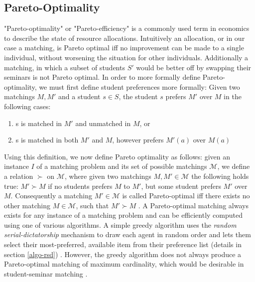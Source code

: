\subsection{Pareto-Optimality}
"Pareto-optimality" or "Pareto-efficiency" is a commonly used term in economics to describe the state of resource allocations. Intuitively an allocation, or in our case a matching, is Pareto optimal iff no improvement can be made to a single individual, without worsening the situation for other individuals. Additionally a matching, in which a subset of students $S'$ would be better off by swapping their seminars is not Pareto optimal.
In order to more formally define Pareto-optimality, we must first define student preferences more formally: 
Given two matchings $M, M'$ and a student $s \in S$, the student $s$ prefers $M'$ over $M$ in the following cases:
\begin{enumerate}
    \item s is matched in $M'$ and unmatched in $M$, or
    \item s is matched in both $M'$ and $M$, however prefers $M'(a)$ over $M(a)$
\end{enumerate}
Using this definition, we now define Pareto optimality as follows: given an instance $I$ of a matching problem and its set of possible matchings $\mathcal{M}$, we define a relation $\succ$ on $\mathcal{M}$, where given two matchings $M, M' \in \mathcal{M}$ the following holds true: $M' \succ M$ if no students prefers $M$ to $M'$, but some student prefers $M'$ over $M$. Consequently a matching $M' \in \mathcal{M}$ is called Pareto-optimal iff there exists no other matching $M \in \mathcal{M}$, such that $M' \succ M$ \cite{algorithmics}. A Pareto-optimal matching always exists for any instance of a matching problem and can be efficiently computed using one of various algorithms. A simple greedy algorithm uses the \emph{random serial-dictatorship} mechanism to draw each agent in random order and lets them select their most-preferred, available item from their preference list (details in section \ref{algo-rsd}) \cite{RothTwoSided, SerialDictatorship}. However, the greedy algorithm does not always produce a Pareto-optimal matching of maximum cardinality, which would be desirable in student-seminar matching \cite{Abraham:Pacha}.

